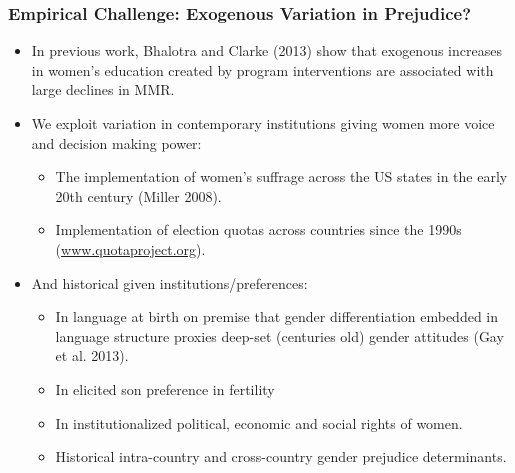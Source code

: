 \documentclass[10pt,letterpaper,subeqn]{beamer}
\begin{document}
\begin{frame}
  \frametitle{Empirical Challenge: Exogenous Variation in Prejudice?}
  \begin{itemize}
  \setlength{\itemsep}{7pt}
\item In previous work, Bhalotra and Clarke (2013) show that exogenous increases in women's education created by program interventions are associated with large declines in MMR.
\item We exploit variation in contemporary institutions giving women more voice and decision making power:
  \begin{itemize}
  \item The implementation of women's suffrage across the US states in the early 20th century  (Miller 2008).
  \item Implementation of election quotas across countries since the 1990s (\url{www.quotaproject.org}).
  \end{itemize}
\item And historical given institutions/preferences:
  \begin{itemize}
  \item In language at birth on premise that gender differentiation embedded in language structure proxies deep-set (centuries old) gender attitudes (Gay et al. 2013). 
  \item In elicited son preference in fertility
  \item In institutionalized political, economic and social rights of women. 
  \item Historical intra-country and cross-country gender prejudice determinants.
  \end{itemize}
\end{itemize}
\end{frame}




\end{document}
